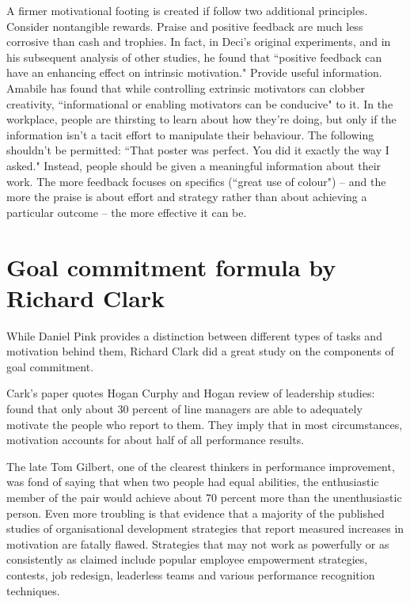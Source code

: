 \begin{compactitem}
A firmer motivational footing is created if follow two additional principles.
\subitem Consider nontangible rewards. Praise and positive feedback are much less corrosive than cash and trophies. In fact, in Deci’s original experiments, and in his subsequent analysis of other studies, he found that ``positive feedback can have an enhancing effect on intrinsic motivation."
\subitem Provide useful information. Amabile has found that while controlling extrinsic motivators can clobber creativity, ``informational or enabling motivators can be conducive" to it. In the workplace, people are thirsting to learn about how they’re doing, but only if the information isn’t a tacit effort to manipulate their behaviour. The following shouldn't be permitted: ``That poster was perfect. You did it exactly the way I asked." Instead, people should be given a meaningful information about their work. The more feedback focuses on specifics (``great use of colour") -- and the more the praise is about effort and strategy rather than about achieving a particular outcome -- the more effective it can be.
\end{compactitem}

\section{Goal commitment formula by Richard Clark}

While Daniel Pink provides a distinction between different types of tasks and motivation behind them, Richard Clark did a great study on the components of goal commitment. 

Cark's paper quotes Hogan Curphy and Hogan review of leadership studies: found that only about 30 percent of line managers are able to adequately motivate the people who report to them. They imply that in most circumstances, motivation accounts for about half of all performance results.

The late Tom Gilbert, one of the clearest thinkers in performance improvement, was fond of saying that when two people had equal abilities, the enthusiastic member of the pair would achieve about 70 percent more than the unenthusiastic person. Even more troubling is that evidence that a majority of the published studies of organisational development strategies that report measured increases in motivation are fatally flawed. Strategies that may not work as powerfully or as consistently as claimed include popular employee empowerment strategies, contests, job redesign, leaderless teams and various performance recognition techniques.

